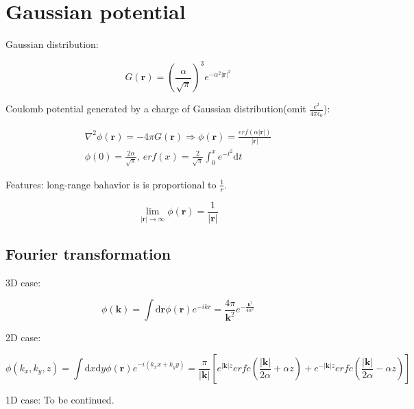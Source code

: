 \section{Gaussian potential}

\noindent
Gaussian distribution:

\begin{equation}\label{Gaussian-distribution}
    G(\boldsymbol{r}) = \left( \frac{\alpha}{\sqrt{\pi}} \right)^{3} e^{-\alpha^2|\boldsymbol{r}|^2}
\end{equation}

\noindent
Coulomb potential generated by a charge of Gaussian distribution(omit $\frac{e^2}{4\pi\epsilon_0}$):

\begin{equation}\label{Gaussian-potential}
    \begin{gathered}
        \nabla^{2} \phi(\boldsymbol{r}) = - 4\pi G(\boldsymbol{r}) 
        \Rightarrow \phi(\boldsymbol{r}) = \frac{erf(\alpha |\boldsymbol{r}|)}{|\boldsymbol{r}|} \\
        \phi(0) = \frac{2\alpha}{\sqrt{\pi}} ,\,
        erf(x) = \frac{2}{\sqrt{\pi}} \int_{0}^{x} e^{-t^2} \mathrm{d}t 
    \end{gathered}
\end{equation}

\noindent
Features: long-range bahavior is is proportional to $\frac{1}{r}$.

\begin{equation}
    \lim_{|\boldsymbol{r}| \rightarrow \infty} \phi(\boldsymbol{r}) = \frac{1}{|\boldsymbol{r}|}
\end{equation}

\subsection{Fourier transformation}

\noindent
3D case:

\begin{equation}\label{Gaussian-potential-Fourier-3D}
    \phi(\boldsymbol{k}) = \int \mathrm{d}\boldsymbol{r} \phi(\boldsymbol{r}) e^{-ikr}
    = \frac{4\pi}{\boldsymbol{k}^2} e^{-\frac{\boldsymbol{k}^2}{4\alpha^2}}
\end{equation}

\noindent
2D case:

\begin{equation}\label{Gaussian-potential-Fourier-2D}
    \phi(k_x,k_y,z) = \int \mathrm{d}x \mathrm{d}y \phi(\boldsymbol{r}) e^{-i(k_xx+k_yy)}
    = \frac{\pi}{|\boldsymbol{k}|} \left[ 
        e^{|\boldsymbol{k}|z} erfc(\frac{|\boldsymbol{k}|}{2\alpha} 
        + \alpha z) + e^{-|\boldsymbol{k}|z} erfc(\frac{|\boldsymbol{k}|}{2\alpha} - \alpha z) 
        \right] 
\end{equation}

\noindent
1D case: To be continued.

